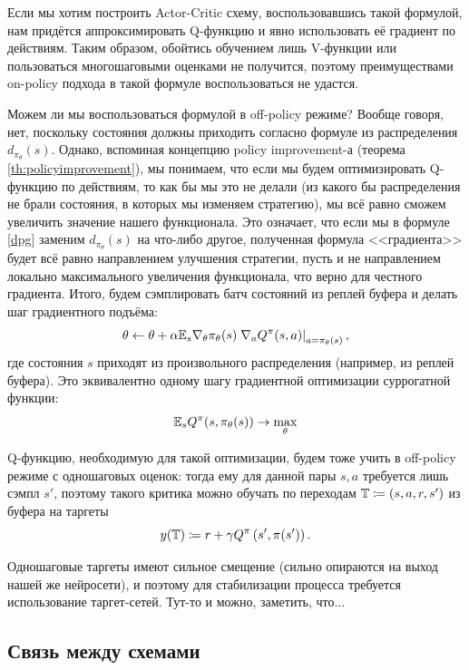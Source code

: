 Если мы хотим построить Actor-Critic схему, воспользовавшись такой формулой, нам придётся аппроксимировать Q-функцию и явно использовать её градиент по действиям. Таким образом, обойтись обучением лишь V-функции или пользоваться многошаговыми оценками не получится, поэтому преимуществами on-policy подхода в такой формуле воспользоваться не удастся.

Можем ли мы воспользоваться формулой в off-policy режиме? Вообще говоря, нет, поскольку состояния должны приходить согласно формуле из распределения $d_{\pi_\theta}(s)$. Однако, вспоминая концепцию policy improvement-а (теорема \ref{th:policyimprovement}), мы понимаем, что если мы будем оптимизировать Q-функцию по действиям, то как бы мы это не делали (из какого бы распределения не брали состояния, в которых мы изменяем стратегию), мы всё равно сможем увеличить значение нашего функционала. Это означает, что если мы в формуле \eqref{dpg} заменим $d_{\pi_\theta}(s)$ на что-либо другое, полученная формула <<градиента>> будет всё равно направлением улучшения стратегии, пусть и не направлением локально максимального увеличения функционала, что верно для честного градиента. Итого, будем сэмплировать батч состояний из реплей буфера и делать шаг градиентного подъёма: 
$$\theta \leftarrow \theta + \alpha \mathbb{E}_{s} \nabla_\theta \pi_\theta(s) \left. \nabla_a Q^{\pi}(s, a) \right|_{a = \pi_\theta(s)},$$
где состояния $s$ приходят из произвольного распределения (например, из реплей буфера). Это эквивалентно одному шагу градиентной оптимизации суррогатной функции:
\begin{equation}\label{ddpg_actor}
\mathbb{E}_s Q^{\pi}(s, \pi_{\theta}(s)) \to \max_{\theta}
\end{equation}

Q-функцию, необходимую для такой оптимизации, будем тоже учить в off-policy режиме с одношаговых оценок: тогда ему для данной пары $s,a$ требуется лишь сэмпл $s'$, поэтому такого критика можно обучать по переходам $\mathbb{T} \coloneqq (s, a, r, s')$ из буфера на таргеты
$$y(\mathbb{T}) \coloneqq r + \gamma Q^{\pi}\left( s', \pi(s') \right).$$

Одношаговые таргеты имеют сильное смещение (сильно опираются на выход нашей же нейросети), и поэтому для стабилизации процесса требуется использование таргет-сетей. Тут-то и можно, заметить, что...

\subsection{Связь между схемами}

